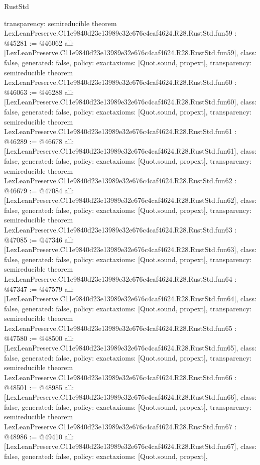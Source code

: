 \begin{lexlean}{RustStd}
\begin{coremodule}
{  transparency: semireducible
}
theorem LexLeanPreserve.C11e9840d23e13989e32e676c4caf4624.R28.RustStd.fun59 : @45281 := @46062 {
  all: [LexLeanPreserve.C11e9840d23e13989e32e676c4caf4624.R28.RustStd.fun59],
  class: false,
  generated: false,
  policy: exact{axioms: [Quot.sound, propext]},
  transparency: semireducible
}
theorem LexLeanPreserve.C11e9840d23e13989e32e676c4caf4624.R28.RustStd.fun60 : @46063 := @46288 {
  all: [LexLeanPreserve.C11e9840d23e13989e32e676c4caf4624.R28.RustStd.fun60],
  class: false,
  generated: false,
  policy: exact{axioms: [Quot.sound, propext]},
  transparency: semireducible
}
theorem LexLeanPreserve.C11e9840d23e13989e32e676c4caf4624.R28.RustStd.fun61 : @46289 := @46678 {
  all: [LexLeanPreserve.C11e9840d23e13989e32e676c4caf4624.R28.RustStd.fun61],
  class: false,
  generated: false,
  policy: exact{axioms: [Quot.sound, propext]},
  transparency: semireducible
}
theorem LexLeanPreserve.C11e9840d23e13989e32e676c4caf4624.R28.RustStd.fun62 : @46679 := @47084 {
  all: [LexLeanPreserve.C11e9840d23e13989e32e676c4caf4624.R28.RustStd.fun62],
  class: false,
  generated: false,
  policy: exact{axioms: [Quot.sound, propext]},
  transparency: semireducible
}
theorem LexLeanPreserve.C11e9840d23e13989e32e676c4caf4624.R28.RustStd.fun63 : @47085 := @47346 {
  all: [LexLeanPreserve.C11e9840d23e13989e32e676c4caf4624.R28.RustStd.fun63],
  class: false,
  generated: false,
  policy: exact{axioms: [Quot.sound, propext]},
  transparency: semireducible
}
theorem LexLeanPreserve.C11e9840d23e13989e32e676c4caf4624.R28.RustStd.fun64 : @47347 := @47579 {
  all: [LexLeanPreserve.C11e9840d23e13989e32e676c4caf4624.R28.RustStd.fun64],
  class: false,
  generated: false,
  policy: exact{axioms: [Quot.sound, propext]},
  transparency: semireducible
}
theorem LexLeanPreserve.C11e9840d23e13989e32e676c4caf4624.R28.RustStd.fun65 : @47580 := @48500 {
  all: [LexLeanPreserve.C11e9840d23e13989e32e676c4caf4624.R28.RustStd.fun65],
  class: false,
  generated: false,
  policy: exact{axioms: [Quot.sound, propext]},
  transparency: semireducible
}
theorem LexLeanPreserve.C11e9840d23e13989e32e676c4caf4624.R28.RustStd.fun66 : @48501 := @48985 {
  all: [LexLeanPreserve.C11e9840d23e13989e32e676c4caf4624.R28.RustStd.fun66],
  class: false,
  generated: false,
  policy: exact{axioms: [Quot.sound, propext]},
  transparency: semireducible
}
theorem LexLeanPreserve.C11e9840d23e13989e32e676c4caf4624.R28.RustStd.fun67 : @48986 := @49410 {
  all: [LexLeanPreserve.C11e9840d23e13989e32e676c4caf4624.R28.RustStd.fun67],
  class: false,
  generated: false,
  policy: exact{axioms: [Quot.sound, propext]},
}
\end{coremodule}
\end{lexlean}
